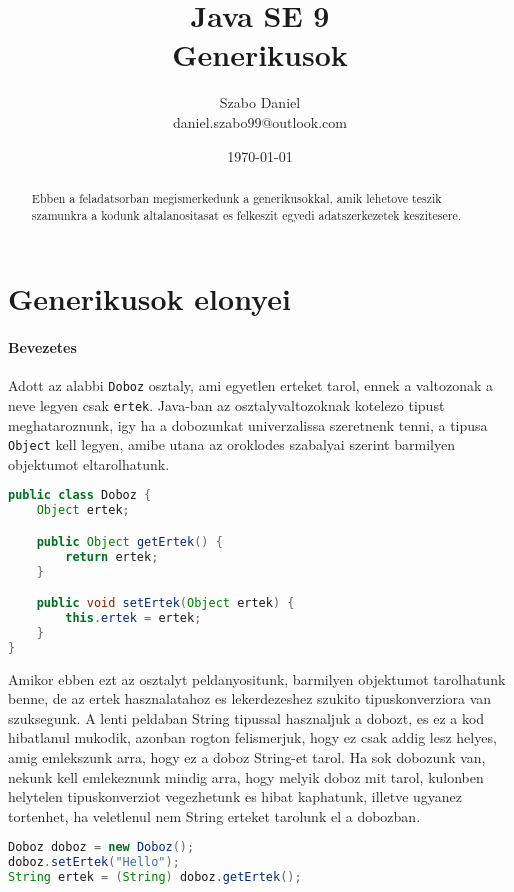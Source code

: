 \documentclass{article}
\title{%
Java SE 9 \\
\large Generikusok}
\author{Szabo Daniel\\daniel.szabo99@outlook.com}
\date{\today}
\let\l\lstinline
\begin{document}
\maketitle
\begin{abstract}
Ebben a feladatsorban megismerkedunk a generikusokkal, amik lehetove teszik szamunkra a kodunk altalanositasat es felkeszit egyedi adatszerkezetek keszitesere.
\end{abstract}

\newpage

\tableofcontents{}

\newpage

\section{Generikusok elonyei}
\paragraph{Bevezetes}

Adott az alabbi \l{Doboz} osztaly, ami egyetlen erteket tarol, ennek a valtozonak a neve legyen csak \l{ertek}. Java-ban az osztalyvaltozoknak kotelezo tipust meghataroznunk, igy ha a dobozunkat univerzalissa szeretnenk tenni, a tipusa \l{Object} kell legyen, amibe utana az oroklodes szabalyai szerint barmilyen objektumot eltarolhatunk.

\begin{lstlisting}[language=Java, caption=Doboz osztaly]
public class Doboz {
	Object ertek;

	public Object getErtek() {
		return ertek;
	}

	public void setErtek(Object ertek) {
		this.ertek = ertek;
	}
}
\end{lstlisting}

Amikor ebben ezt az osztalyt peldanyositunk, barmilyen objektumot tarolhatunk benne, de az ertek hasznalatahoz es lekerdezeshez szukito tipuskonverziora van szuksegunk. A lenti peldaban String tipussal hasznaljuk a dobozt, es ez a kod hibatlanul mukodik, azonban rogton felismerjuk, hogy ez csak addig lesz helyes, amig emlekszunk arra, hogy ez a doboz String-et tarol. Ha sok dobozunk van, nekunk kell emlekeznunk mindig arra, hogy melyik doboz mit tarol, kulonben helytelen tipuskonverziot vegezhetunk es hibat kaphatunk, illetve ugyanez tortenhet, ha veletlenul nem String erteket tarolunk el a dobozban.

\begin{lstlisting}[language=Java, caption=Doboz hasznalata String-gel]
Doboz doboz = new Doboz();
doboz.setErtek("Hello");
String ertek = (String) doboz.getErtek();
\end{lstlisting}
\end{document}
